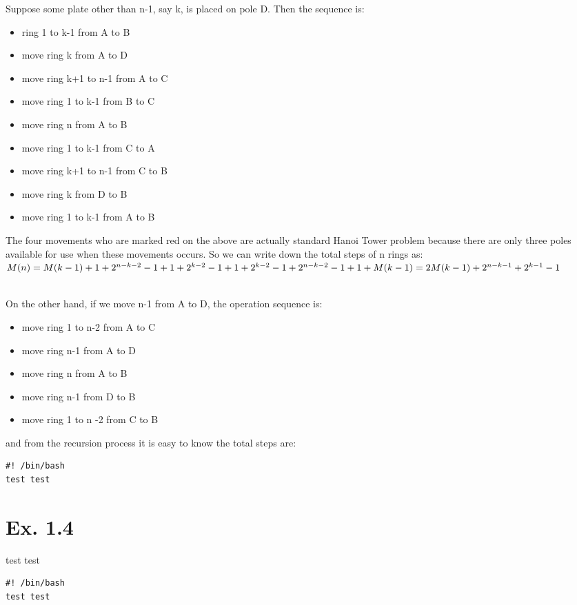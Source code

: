 \documentclass[a4paper,11pt]{article}
\theoremstyle{mytheor}
\begin{document}
Suppose some plate other than n-1, say k, is placed on pole D. 
Then the sequence is:
\begin{itemize}
    \item ring 1 to k-1 from A to B 
    \item move ring k from A to D  
    \item {\color{red}move ring k+1 to n-1 from A to C}
    \item {\color{red}move ring 1 to k-1 from B to C}
    \item move ring n from A to B
    \item {\color{red}move ring 1 to k-1 from C to A}
    \item {\color{red}move ring k+1 to n-1 from C to B}
    \item move ring k from D to B
    \item move ring 1 to k-1 from A to B

\end{itemize}
The four movements who are marked {\color{red}red} on the above are actually standard Hanoi Tower problem because there are only three poles available for use when these movements occurs.
So we can write down the total steps of n rings as:
$
\\M(n) = M(k-1) + 1 + 2^{n-k-2} - 1 + 1 + 2^{k-2} -1 + 1 + 2^{k-2}-1 + 2^{n-k-2} - 1 + 1 + M(k-1) \\
=2M(k-1) + 2^{n-k-1} + 2^{k-1} -1
$


~\\
On the other hand, if we move n-1 from A to D, the operation sequence is:
\begin{itemize}
    \item move ring 1 to n-2 from A to C
    \item move ring n-1 from A to D
    \item move ring n from A to B
    \item move ring n-1 from D to B
    \item move ring 1 to n -2 from C to B
\end{itemize}
and from the recursion process it is easy to know the total steps are:



\begin{lstlisting}[label={list:third},caption=Sample Bash code.]
#! /bin/bash
test test
\end{lstlisting}


\section*{Ex. 1.4}
test test
\begin{lstlisting}[label={list:fourth},caption=Sample Bash code.]
#! /bin/bash
test test
\end{lstlisting}
\end{document}
